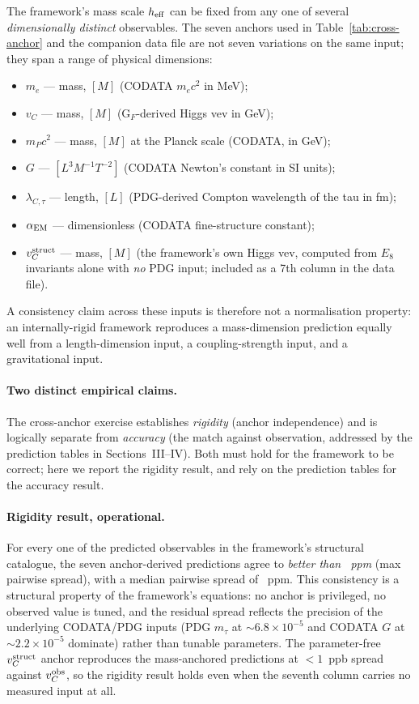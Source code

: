 \documentclass[reprint,amsmath,amssymb,aps,prd,longbibliography,floatfix]{revtex4-2}
\begin{document}
The framework's mass scale $h_{\rm eff}$ can be fixed from any one
of several \emph{dimensionally distinct} observables. The seven
anchors used in Table~\ref{tab:cross-anchor} and the companion data
file are not seven variations on the same input; they span a range
of physical dimensions:
\begin{itemize}\itemsep0pt
\item $m_e$ --- mass, $[M]$ (CODATA $m_e c^2$ in MeV);
\item $v_C$ --- mass, $[M]$ (G$_F$-derived Higgs vev in GeV);
\item $m_P c^2$ --- mass, $[M]$ at the Planck scale (CODATA, in GeV);
\item $G$ --- $[L^3 M^{-1} T^{-2}]$ (CODATA Newton's constant in
SI units);
\item $\lambda_{C,\tau}$ --- length, $[L]$ (PDG-derived Compton
wavelength of the tau in fm);
\item $\alpha_{\rm EM}$ --- dimensionless (CODATA fine-structure
constant);
\item $v_C^{\rm struct}$ --- mass, $[M]$ (the framework's own Higgs
vev, computed from $E_8$ invariants alone with \emph{no} PDG input;
included as a 7th column in the data file).
\end{itemize}
A consistency claim across these inputs is therefore not a
normalisation property: an internally-rigid framework reproduces a
mass-dimension prediction equally well from a length-dimension
input, a coupling-strength input, and a gravitational input.

\paragraph{Two distinct empirical claims.}
The cross-anchor exercise establishes \emph{rigidity} (anchor
independence) and is logically separate from \emph{accuracy} (the
match against observation, addressed by the prediction tables in
Sections~III--IV). Both must hold for the framework to be
correct; here we report the rigidity result, and rely on the
prediction tables for the accuracy result.

\paragraph{Rigidity result, operational.}
For every one of the \crossanchorNObservables{} predicted
observables in the framework's structural catalogue, the seven
anchor-derived predictions agree to \emph{better than
\crossanchorMaxPpm~ppm} (max pairwise spread), with a median
pairwise spread of \crossanchorMedianPpm~ppm. This consistency is a
structural property of the framework's equations: no anchor is
privileged, no observed value is tuned, and the residual spread
reflects the precision of the underlying CODATA/PDG inputs (PDG
$m_\tau$ at $\sim 6.8\times 10^{-5}$ and CODATA $G$ at $\sim
2.2\times 10^{-5}$ dominate) rather than tunable parameters. The
parameter-free $v_C^{\rm struct}$ anchor reproduces the
mass-anchored predictions at $<\!1$~ppb spread against $v_C^{\rm
obs}$, so the rigidity result holds even when the seventh
column carries no measured input at all.
\end{document}
